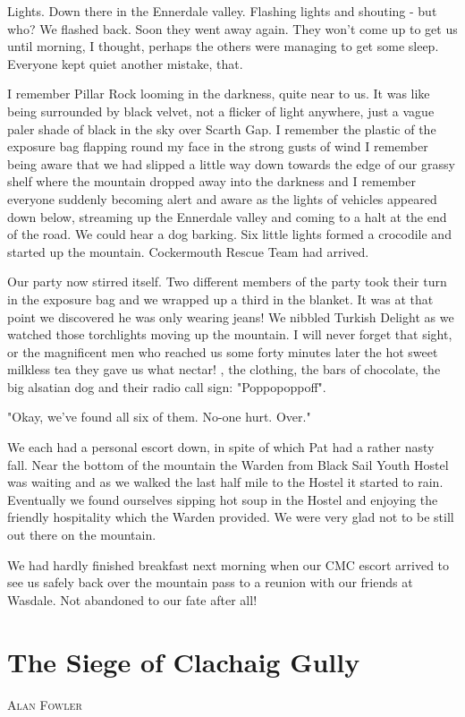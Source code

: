 \documentclass[a5paper,openany,font 10pt]{scrbook}
\makeatletter
\newcommand{\chapterauthor}[1]{%
{\parindent0pt\vspace*{-5pt}%
\linespread{1.1}\large\scshape#1%
\par\nobreak\vspace*{35pt}}
\@afterheading%
}
\makeatother
\begin{document}
Lights. Down there in the Ennerdale valley. Flashing lights
and shouting - but who? We flashed back. Soon they went away
again. They won't come up to get us until morning, I thought,
perhaps the others were managing to get some sleep. Everyone kept
quiet   another mistake, that.

I remember Pillar Rock looming in the darkness, quite near
to us. It was like being surrounded by black velvet, not a
flicker of light anywhere, just a vague paler shade of black in
the sky over Scarth Gap. I remember the plastic of the exposure
bag flapping round my face in the strong gusts of wind  I
remember being aware that we had slipped a little way down
towards the edge of our grassy shelf where the mountain dropped
away into the darkness  and I remember everyone suddenly becoming
alert and aware as the lights of vehicles appeared down below,
streaming up the Ennerdale valley and coming to a halt at the end
of the road. We could hear a dog barking. Six little lights
formed a crocodile and started up the mountain. Cockermouth
Rescue Team had arrived.

Our party now stirred itself. Two different members of the
party took their turn in the exposure bag and we wrapped up a
third in the blanket. It was at that point we discovered he was
only wearing jeans! We nibbled Turkish Delight as we watched
those torchlights moving up the mountain. I will never forget
that sight, or the magnificent men who reached us some forty
minutes later  the hot sweet milkless tea they gave us  what
nectar! , the clothing, the bars of chocolate, the big alsatian
dog and their radio call sign:  "Poppopoppoff".

"Okay, we've found all six of them. No-one hurt. Over."

We each had a personal escort down, in spite of which Pat
had a rather nasty fall. Near the bottom of the mountain the
Warden from Black Sail Youth Hostel was waiting and as we walked
the last half mile to the Hostel it started to rain. Eventually
we found ourselves sipping hot soup in the Hostel and enjoying
the friendly hospitality which the Warden provided. We were very
glad not to be still out there on the mountain.

We had hardly finished breakfast next morning when our CMC
escort arrived to see us safely back over the mountain pass to a
reunion with our friends at Wasdale. Not abandoned to our fate
after all!

\chapter{The Siege of Clachaig Gully}
\label{sec:orgb9cbb70}
\chapterauthor{Alan Fowler}
\end{document}

